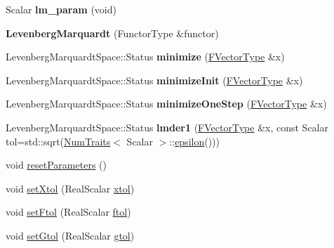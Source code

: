 \begin{DoxyCompactItemize}
Scalar {\bfseries lm\+\_\+param} (void)
\item 
\mbox{\label{class_eigen_1_1_levenberg_marquardt_ac6f47b62a823190b3e28b3eb634e1cca}} 
{\bfseries Levenberg\+Marquardt} (Functor\+Type \&functor)
\item 
\mbox{\label{class_eigen_1_1_levenberg_marquardt_a5b7c5decf3d9a37c6cfacf795766e928}} 
Levenberg\+Marquardt\+Space\+::\+Status {\bfseries minimize} (\hyperlink{group___core___module}{F\+Vector\+Type} \&x)
\item 
\mbox{\label{class_eigen_1_1_levenberg_marquardt_ad22b48fa04cad42ea372101d3e1e0e72}} 
Levenberg\+Marquardt\+Space\+::\+Status {\bfseries minimize\+Init} (\hyperlink{group___core___module}{F\+Vector\+Type} \&x)
\item 
\mbox{\label{class_eigen_1_1_levenberg_marquardt_a6a9a7e5a6c1acf2bcf3ada782454f31e}} 
Levenberg\+Marquardt\+Space\+::\+Status {\bfseries minimize\+One\+Step} (\hyperlink{group___core___module}{F\+Vector\+Type} \&x)
\item 
\mbox{\label{class_eigen_1_1_levenberg_marquardt_ac53fc43535b436fd243e285f98359133}} 
Levenberg\+Marquardt\+Space\+::\+Status {\bfseries lmder1} (\hyperlink{group___core___module}{F\+Vector\+Type} \&x, const Scalar tol=std\+::sqrt(\hyperlink{group___core___module_struct_eigen_1_1_num_traits}{Num\+Traits}$<$ Scalar $>$\+::\hyperlink{class_eigen_1_1_levenberg_marquardt_aac799068926ca0bc3387b2dc5c0eb113}{epsilon}()))
\item 
void \hyperlink{class_eigen_1_1_levenberg_marquardt_a16172a2048058ea0a908213a7b0f8971}{reset\+Parameters} ()
\item 
void \hyperlink{class_eigen_1_1_levenberg_marquardt_a691b571366630f1329d2de7a5e40e7a5}{set\+Xtol} (Real\+Scalar \hyperlink{class_eigen_1_1_levenberg_marquardt_a25a7629ea877d8f08670536b3d234897}{xtol})
\item 
void \hyperlink{class_eigen_1_1_levenberg_marquardt_a09c0852c6a4534b84a16ac5d9c631c12}{set\+Ftol} (Real\+Scalar \hyperlink{class_eigen_1_1_levenberg_marquardt_a957ac071ec775779bb03d10b463ddfbc}{ftol})
\item 
void \hyperlink{class_eigen_1_1_levenberg_marquardt_ad5610b2353f1ce5e0c7357ed1b215fea}{set\+Gtol} (Real\+Scalar \hyperlink{class_eigen_1_1_levenberg_marquardt_a18597c537ec7d492ee6d43788178e458}{gtol})

\end{DoxyCompactItemize}
